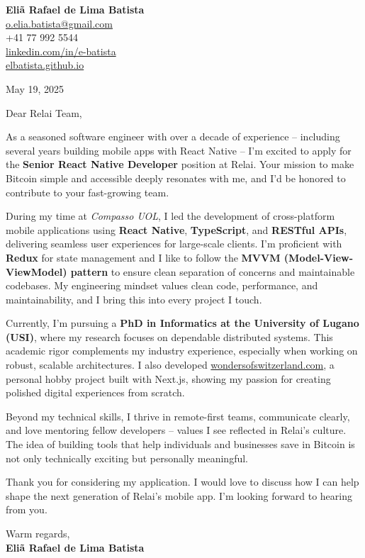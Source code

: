 \documentclass[11pt]{article}
\begin{document}
\noindent
\textbf{Eliã Rafael de Lima Batista} \\
\href{mailto:o.elia.batista@gmail.com}{o.elia.batista@gmail.com} \\
+41 77 992 5544 \\
\href{https://linkedin.com/in/e-batista}{linkedin.com/in/e-batista} \\
\href{https://elbatista.github.io}{elbatista.github.io}

\vspace{1em}

May 19, 2025 \\
\vspace{1em}

Dear Relai Team,

\vspace{1em}

As a seasoned software engineer with over a decade of experience -- including several years building mobile apps with React Native -- I’m excited to apply for the \textbf{Senior React Native Developer} position at Relai. Your mission to make Bitcoin simple and accessible deeply resonates with me, and I’d be honored to contribute to your fast-growing team.

During my time at \textit{Compasso UOL}, I led the development of cross-platform mobile applications using \textbf{React Native}, \textbf{TypeScript}, and \textbf{RESTful APIs}, delivering seamless user experiences for large-scale clients. I’m proficient with \textbf{Redux} for state management and I like to follow the \textbf{MVVM (Model-View-ViewModel) pattern} to ensure clean separation of concerns and maintainable codebases. My engineering mindset values clean code, performance, and maintainability, and I bring this into every project I touch.


Currently, I’m pursuing a \textbf{PhD in Informatics at the University of Lugano (USI)}, where my research focuses on dependable distributed systems. This academic rigor complements my industry experience, especially when working on robust, scalable architectures. I also developed \href{https://wondersofswitzerland.com}{wondersofswitzerland.com}, a personal hobby project built with Next.js, showing my passion for creating polished digital experiences from scratch.

Beyond my technical skills, I thrive in remote-first teams, communicate clearly, and love mentoring fellow developers -- values I see reflected in Relai’s culture. The idea of building tools that help individuals and businesses save in Bitcoin is not only technically exciting but personally meaningful.

\vspace{1em}

Thank you for considering my application. I would love to discuss how I can help shape the next generation of Relai’s mobile app. I’m looking forward to hearing from you.

\vspace{1em}

Warm regards, \\
\textbf{Eliã Rafael de Lima Batista}
\end{document}
